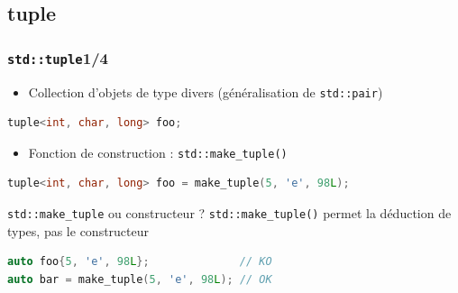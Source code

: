 \documentclass[C++.tex]{subfiles}
\begin{document}
\subsection*{tuple}
\begin{frame}[fragile]
	\frametitle{\lstinline|std::tuple|\titlehfill{}1/4}
	\begin{itemize}
		\item Collection d'objets de type divers (généralisation de \lstinline|std::pair|)
	\end{itemize}

	\begin{lstlisting}[language=C++]
tuple<int, char, long> foo;\end{lstlisting}

	\begin{itemize}
		\item Fonction de construction : \lstinline|std::make_tuple()|
	\end{itemize}

	\begin{lstlisting}[language=C++]
tuple<int, char, long> foo = make_tuple(5, 'e', 98L);\end{lstlisting}

	\begin{block}{\lstinline|std::make_tuple| ou constructeur ?}
		\lstinline|std::make_tuple()| permet la déduction de types, pas le constructeur

		\begin{lstlisting}[language=C++]
auto foo{5, 'e', 98L};              // KO
auto bar = make_tuple(5, 'e', 98L); // OK\end{lstlisting}
	\end{block}
\end{frame}
\end{document}
